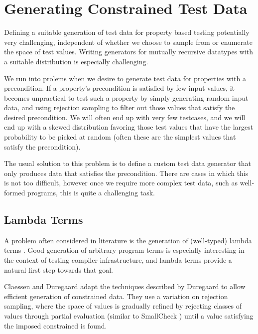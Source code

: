\documentclass[a4paper,msc,twosized=semi]{uustthesis}
\begin{document}
\section{Generating Constrained Test Data}\label{genconstrainedtd}

  Defining a suitable generation of test data for property based testing potentially very challenging, independent of whether we choose to sample from 
  or enumerate the space of test values. Writing generators for mutually recursive 
  datatypes with a suitable distribution is especially challenging. 
    
  We run into prolems when we desire to generate test data for properties with a 
  precondition. If a property's precondition is satisfied by few input values, it 
  becomes unpractical to test such a property by simply generating random input data, 
  and using rejection sampling to filter out those values that satisfy the desired 
  precondition. We will often end up with very few testcases, and we will end up with 
  a skewed distribution favoring those test values that have the largest probability 
  to be picked at random (often these are the simplest values that satisfy the 
  precondition). 
  
  The usual solution to this problem is to define a custom test data generator that 
  only produces data that satisfies the precondition. There are cases in which this is 
  not too difficult, however once we require more complex test data, such as 
  well-formed programs, this is quite a challenging task. 

\subsection{Lambda Terms} 

  A problem often considered in literature is the generation of (well-typed) lambda 
  terms \cite{palka2011testing, grygiel2013counting, claessen2015generating}. Good 
  generation of arbitrary program terms is especially interesting in the context of 
  testing compiler infrastructure, and lambda terms provide a natural first step 
  towards that goal. 

  Claessen and Duregaard \cite{claessen2015generating} adapt the techniques described 
  by Duregaard \cite{duregaard2013feat} to allow efficient generation of constrained 
  data. They use a variation on rejection sampling, where the space of values is 
  gradually refined by rejecting classes of values through partial evaluation (similar 
  to SmallCheck \cite{runciman2008smallcheck}) until a value satisfying the imposed 
  constrained is found. 
\end{document}

